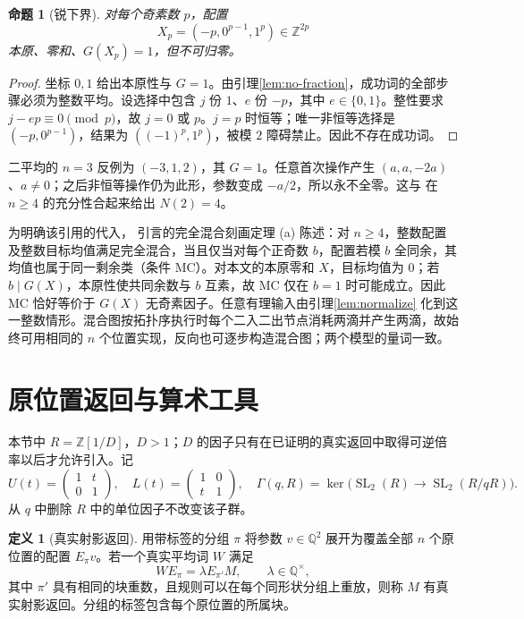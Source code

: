 \documentclass[11pt,a4paper]{article}
\newcommand{\QQ}{\mathbb Q}
\newcommand{\ZZ}{\mathbb Z}
\newcommand{\SL}{\operatorname{SL}}
\newtheorem{proposition}[theorem]{命题}
\theoremstyle{definition}
\newtheorem{definition}[theorem]{定义}
\numberwithin{equation}{section}
\begin{document}
\begin{proposition}[锐下界]\label{prop:lower}
对每个奇素数 $p$，配置
\[X_p=(-p,0^{p-1},1^p)\in\ZZ^{2p}\]
本原、零和、$G(X_p)=1$，但不可归零。
\end{proposition}
\begin{proof}
坐标 $0,1$ 给出本原性与 $G=1$。由引理\ref{lem:no-fraction}，成功词的全部步骤必须为整数平均。设选择中包含 $j$ 份 $1$、$e$ 份 $-p$，其中 $e\in\{0,1\}$。整性要求 $j-ep\equiv0\pmod p$，故 $j=0$ 或 $p$。$j=p$ 时恒等；唯一非恒等选择是 $(-p,0^{p-1})$，结果为 $((-1)^p,1^p)$，被模 $2$ 障碍禁止。因此不存在成功词。
\end{proof}

二平均的 $n=3$ 反例为 $(-3,1,2)$，其 $G=1$。任意首次操作产生 $(a,a,-2a)$、$a\ne0$；之后非恒等操作仍为此形，参数变成 $-a/2$，所以永不全零。这与\cite{mixing} 在 $n\ge4$ 的充分性合起来给出 $N(2)=4$。

为明确该引用的代入，\cite{mixing} 引言的完全混合刻画定理 (a) 陈述：对 $n\ge4$，整数配置及整数目标均值满足完全混合，当且仅当对每个正奇数 $b$，配置若模 $b$ 全同余，其均值也属于同一剩余类（条件 MC）。对本文的本原零和 $X$，目标均值为 $0$；若 $b\mid G(X)$，本原性使共同余数与 $b$ 互素，故 MC 仅在 $b=1$ 时可能成立。因此 MC 恰好等价于 $G(X)$ 无奇素因子。任意有理输入由引理\ref{lem:normalize} 化到这一整数情形。混合图按拓扑序执行时每个二入二出节点消耗两滴并产生两滴，故始终可用相同的 $n$ 个位置实现，反向也可逐步构造混合图；两个模型的量词一致。

\section{原位置返回与算术工具}\label{sec:arithmetic}
本节中 $R=\ZZ[1/D]$，$D>1$；$D$ 的因子只有在已证明的真实返回中取得可逆倍率以后才允许引入。记
\[
 U(t)=\begin{pmatrix}1&t\\0&1\end{pmatrix},\quad
 L(t)=\begin{pmatrix}1&0\\t&1\end{pmatrix},\quad
 \Gamma(q,R)=\ker\bigl(\SL_2(R)\longrightarrow\SL_2(R/qR)\bigr).
\]
从 $q$ 中删除 $R$ 中的单位因子不改变该子群。

\begin{definition}[真实射影返回]
用带标签的分组 $\pi$ 将参数 $v\in\QQ^2$ 展开为覆盖全部 $n$ 个原位置的配置 $E_\pi v$。若一个真实平均词 $W$ 满足
\[W E_\pi=\lambda E_{\pi'}M,\qquad\lambda\in\QQ^\times,\]
其中 $\pi'$ 具有相同的块重数，且规则可以在每个同形状分组上重放，则称 $M$ 有真实射影返回。分组的标签包含每个原位置的所属块。
\end{definition}
\end{document}
